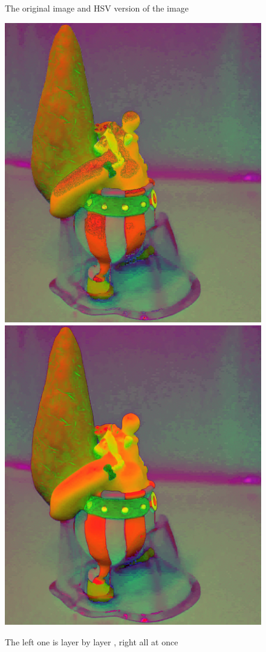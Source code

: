 \documentclass{article}
\begin{document}
\begin{figure}[H]
	\caption{The original image and HSV version of the image}
	\end{figure}
	\begin{figure}[H]
	\includegraphics[scale=0.1]{obelx_hsv_sharpen_layerbylayer.jpg}
	\includegraphics[scale=0.1]{obelx_hsv_sharpen_all.jpg}
	\caption{The left one is layer by layer , right all at once}
	\end{figure}
\end{document}
